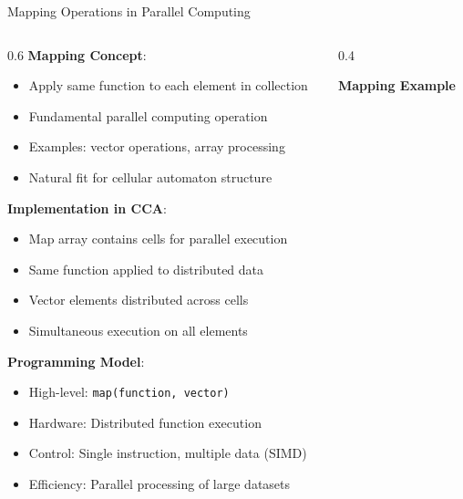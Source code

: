 \documentclass[aspectratio=169]{beamer}
\newcommand{\concept}[1]{\textbf{\color{darkblue}#1}}
\begin{document}
\begin{frame}{Mapping Operations in Parallel Computing}
\begin{columns}
\begin{column}{0.6\textwidth}
\concept{Mapping Concept}:
\begin{itemize}
\item Apply same function to each element in collection
\item Fundamental parallel computing operation
\item Examples: vector operations, array processing
\item Natural fit for cellular automaton structure
\end{itemize}

\vspace{0.3cm}
\concept{Implementation in CCA}:
\begin{itemize}
\item Map array contains cells for parallel execution
\item Same function applied to distributed data
\item Vector elements distributed across cells
\item Simultaneous execution on all elements
\end{itemize}

\vspace{0.3cm}
\concept{Programming Model}:
\begin{itemize}
\item High-level: \texttt{map(function, vector)}
\item Hardware: Distributed function execution
\item Control: Single instruction, multiple data (SIMD)
\item Efficiency: Parallel processing of large datasets
\end{itemize}
\end{column}
\begin{column}{0.4\textwidth}
\begin{center}
\textbf{Mapping Example}
\vspace{0.3cm}

\end{center}
\end{column}
\end{columns}
\end{frame}
\end{document}
